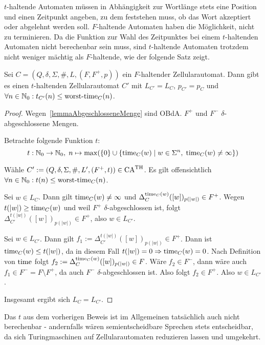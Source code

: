 $t$-haltende Automaten müssen in Abhängigkeit zur Wortlänge stets eine Position und einen Zeitpunkt angeben,
zu dem feststehen muss, ob das Wort akzeptiert oder abgelehnt werden soll.
$F$-haltende Automaten haben die Möglichkeit, nicht zu terminieren.
Da die Funktion zur Wahl des Zeitpunktes bei einem $t$-haltenden Automaten nicht berechenbar sein muss,
sind $t$-haltende Automaten trotzdem nicht weniger mächtig als $F$-haltende, wie der folgende Satz zeigt.

\begin{satz}
    Sei $C = (Q, \delta, \Sigma, \#, L, (F, F^+, p))$ ein $F$-haltender Zellularautomat.
    Dann gibt es einen $t$-haltenden Zellularautomat $C'$ mit $L_{C'} = L_C$, $p_{C'} = p_C$ und $\forall n \in \mathbb{N}_0: t_{C'}(n) \leq \operatorname{worst-time}_C(n)$.
\end{satz}
\begin{proof}
    Wegen~\cref{lemmaAbgeschlosseneMenge} sind \acs{OBdA.} $F^+$ und $F^-$ $\delta$-abgeschlossene Mengen.
    
    Betrachte folgende Funktion $t$:
    \[
        t: \mathbb{N}_0 \to \mathbb{N}_0, \; n \mapsto \max(\{ { 0 } \} \cup \{ { \operatorname{time}_C(w) } \; | \; { w \in \Sigma^n, \; \operatorname{time}_C(w) \neq \infty } \})
    \]

    Wähle $C' := (Q, \delta, \Sigma, \#, L', (F^+, t)) \in \textrm{CA}^{\textrm{TH}}$.
    Es gilt offensichtlich $\forall n \in \mathbb{N}_0: t(n) \leq \operatorname{worst-time}_C(n)$.
    
    Sei $w \in L_C$. Dann gilt $\operatorname{time}_C(w) \neq \infty$ und $\Delta_{C}^{\operatorname{time}_C(w)}([w])_{p(|w|)} \in F^+$.
    Wegen $t(|w|) \geq \operatorname{time}_C(w)$ und weil $F^+$ $\delta$-abgeschlossen ist, folgt $\Delta_{C'}^{t(|w|)}([w])_{p(|w|)} \in F^+$,
    also $w \in L_{C'}$.
    
    Sei $w \in L_{C'}$. Dann gilt $f_1 := \Delta_{C'}^{t(|w|)}([w])_{p(|w|)} \in F^+$.
    Dann ist $\operatorname{time}_C(w) \leq t(|w|)$, da in diesem Fall $t(|w|) = 0 \Rightarrow \operatorname{time}_C(w) = 0$.
    Nach Definition von $\operatorname{time}$ folgt $f_2 := \Delta_{C}^{\operatorname{time}_C(w)}([w])_{p(|w|)} \in F$.
    Wäre $f_2 \in F^-$, dann wäre auch $f_1 \in F^- = F \setminus F^+$, da auch $F^-$ $\delta$-abgeschlossen ist.
    Also folgt $f_2 \in F^+$. Also $w \in L_{C'}$.
    
    Insgesamt ergibt sich $L_C = L_{C'}$.
\end{proof}

\begin{remark}
    Das $t$ aus dem vorherigen Beweis ist im Allgemeinen tatsächlich auch nicht berechenbar - andernfalls
    wären semientscheidbare Sprechen stets entscheidbar, da sich Turingmaschinen auf Zellularautomaten reduzieren lassen und umgekehrt.
\end{remark}

